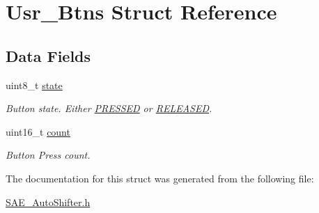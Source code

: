 \hypertarget{struct_usr___btns}{\section{Usr\-\_\-\-Btns Struct Reference}
\label{struct_usr___btns}
}
\subsection*{Data Fields}
\begin{DoxyCompactItemize}
\item 
\hypertarget{struct_usr___btns_a8c0a3343e556825e6b6c30b0e050978b}{uint8\-\_\-t \hyperlink{struct_usr___btns_a8c0a3343e556825e6b6c30b0e050978b}{state}}\label{struct_usr___btns_a8c0a3343e556825e6b6c30b0e050978b}

\begin{DoxyCompactList}\small\item\em Button state. Either \hyperlink{defines_8h_a654adff3c664f27f0b29c24af818dd26}{P\-R\-E\-S\-S\-E\-D} or \hyperlink{defines_8h_ad74b7f5218b46c8332cd531df7178d45}{R\-E\-L\-E\-A\-S\-E\-D}. \end{DoxyCompactList}\item 
\hypertarget{struct_usr___btns_a8275ba5ecf7ab28a7eba0382ddf91577}{uint16\-\_\-t \hyperlink{struct_usr___btns_a8275ba5ecf7ab28a7eba0382ddf91577}{count}}\label{struct_usr___btns_a8275ba5ecf7ab28a7eba0382ddf91577}

\begin{DoxyCompactList}\small\item\em Button Press count. \end{DoxyCompactList}\end{DoxyCompactItemize}


The documentation for this struct was generated from the following file\-:\begin{DoxyCompactItemize}
\item 
\hyperlink{_s_a_e___auto_shifter_8h}{S\-A\-E\-\_\-\-Auto\-Shifter.\-h}\end{DoxyCompactItemize}
